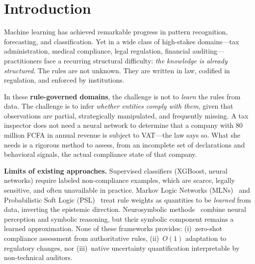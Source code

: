 \documentclass[letterpaper]{article}
\begin{document}
\section{Introduction}
\label{sec:intro}

Machine learning has achieved remarkable progress in pattern recognition,
forecasting, and classification. Yet in a wide class of high-stakes
domains---tax administration, medical compliance, legal regulation,
financial auditing---practitioners face a recurring structural difficulty:
\emph{the knowledge is already structured}. The rules are not unknown.
They are written in law, codified in regulation, and enforced by
institutions.

In these \textbf{rule-governed domains}, the challenge is not to
\emph{learn} the rules from data. The challenge is to infer \emph{whether
entities comply with them}, given that observations are partial,
strategically manipulated, and frequently missing. A tax inspector does
not need a neural network to determine that a company with 80 million
FCFA in annual revenue is subject to VAT---the law says so. What she
needs is a rigorous method to assess, from an incomplete set of
declarations and behavioral signals, the actual compliance state of
that company.

\medskip
\noindent\textbf{Limits of existing approaches.}
Supervised classifiers (XGBoost, neural networks) require labeled
non-compliance examples, which are scarce, legally sensitive, and
often unavailable in practice. Markov Logic Networks
(MLNs)~\citep{richardson2006markov} and Probabilistic Soft Logic
(PSL)~\citep{bach2017hinge} treat rule weights as quantities to be
\emph{learned} from data, inverting the epistemic direction.
Neurosymbolic methods~\citep{garcez2022neural} combine neural
perception and symbolic reasoning, but their symbolic component
remains a learned approximation. None of these frameworks provides:
(i)~zero-shot compliance assessment from authoritative rules,
(ii)~$O(1)$ adaptation to regulatory changes, nor
(iii)~native uncertainty quantification interpretable by non-technical
auditors.
\end{document}
